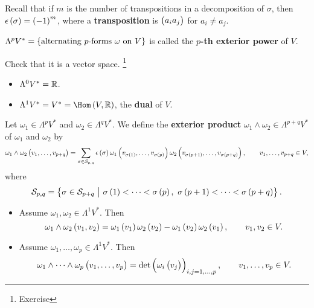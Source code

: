 Recall that if $ m $ is the number of transpositions in a decomposition of $ \sigma $, then $ \epsilon\br{\sigma} = \br{-1}^m $, where a \textbf{transposition} is $ \br{a_ia_j} $ for $ a_i \ne a_j $.

\begin{notation}
$ \Lambda^pV^* = \cbr{\text{alternating $ p $-forms} \ \omega \ \text{on} \ V} $ is called the \textbf{$ p $-th exterior power} of $ V $.
\end{notation}

Check that it is a vector space. \footnote{Exercise}

\begin{example}
\hfill
\begin{itemize}
\item $ \Lambda^0V^* = \mathbb{R} $.
\item $ \Lambda^1V^* = V^* = \Hom\br{V, \RR} $, the \textbf{dual} of $ V $.
\end{itemize}
\end{example}

\begin{definition}
Let $ \omega_1 \in \Lambda^pV^* $ and $ \omega_2 \in \Lambda^qV^* $. We define the \textbf{exterior product} $ \omega_1 \wedge \omega_2 \in \Lambda^{p + q}V^* $ of $ \omega_1 $ and $ \omega_2 $ by
$$ \omega_1 \wedge \omega_2\br{v_1, \dots, v_{p + q}} = \sum_{\sigma \in \SSS_{p, q}} \epsilon\br{\sigma}\omega_1\br{v_{\sigma\br{1}}, \dots, v_{\sigma\br{p}}}\omega_2\br{v_{\sigma\br{p + 1}}, \dots, v_{\sigma\br{p + q}}}, \qquad v_1, \dots, v_{p + q} \in V, $$
where
$$ \SSS_{p, q} = \cbr{\sigma \in \SSS_{p + q} \st \sigma\br{1} < \dots < \sigma\br{p}, \ \sigma\br{p + 1} < \dots < \sigma\br{p + q}}. $$
\end{definition}

\begin{example}
\hfill
\begin{itemize}
\item Assume $ \omega_1, \omega_2 \in \Lambda^1V^* $. Then
$$ \omega_1 \wedge \omega_2\br{v_1, v_2} = \omega_1\br{v_1}\omega_2\br{v_2} - \omega_1\br{v_2}\omega_2\br{v_1}, \qquad v_1, v_2 \in V. $$
\item Assume $ \omega_1, \dots, \omega_p \in \Lambda^1V^* $. Then
$$ \omega_1 \wedge \dots \wedge \omega_p\br{v_1, \dots, v_p} = \det \br{\omega_i\br{v_j}}_{i, j = 1, \dots, p}, \qquad v_1, \dots, v_p \in V. $$
\end{itemize}
\end{example}

